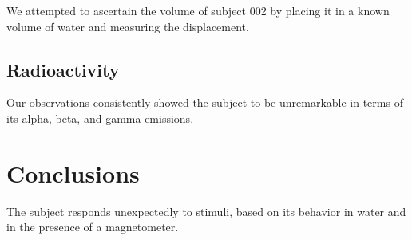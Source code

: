\documentclass[10pt]{article}
\theoremstyle{definition}
\begin{document}
We attempted to ascertain the volume of subject 002 by placing it in a known volume of water and measuring the displacement.


\subsection{Radioactivity}
Our observations consistently showed the subject to be unremarkable in terms of its alpha, beta, and gamma emissions.

\section{Conclusions}\label{conclusions}
The subject responds unexpectedly to stimuli, based on its behavior in water and in the presence of a magnetometer.
\end{document}
